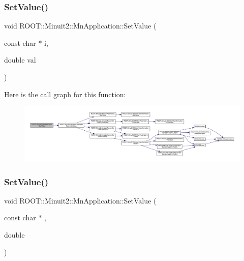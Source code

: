 \subsubsection{\texorpdfstring{SetValue()}{SetValue()}\hspace{0.1cm}{\footnotesize\ttfamily [4/6]}}
{\footnotesize\ttfamily void R\+O\+O\+T\+::\+Minuit2\+::\+Mn\+Application\+::\+Set\+Value (\begin{DoxyParamCaption}\item[{const char $\ast$}]{i,  }\item[{double}]{val }\end{DoxyParamCaption})}

Here is the call graph for this function\+:
\nopagebreak
\begin{figure}[H]
\begin{center}
\leavevmode
\includegraphics[width=350pt]{df/dd5/classROOT_1_1Minuit2_1_1MnApplication_af8376fc6c9a727c8f3dbdc268afb0e7e_cgraph}
\end{center}
\end{figure}
\mbox{\label{classROOT_1_1Minuit2_1_1MnApplication_af8376fc6c9a727c8f3dbdc268afb0e7e}} 
\subsubsection{\texorpdfstring{SetValue()}{SetValue()}\hspace{0.1cm}{\footnotesize\ttfamily [5/6]}}
{\footnotesize\ttfamily void R\+O\+O\+T\+::\+Minuit2\+::\+Mn\+Application\+::\+Set\+Value (\begin{DoxyParamCaption}\item[{const char $\ast$}]{,  }\item[{double}]{ }\end{DoxyParamCaption})}

\mbox{\label{classROOT_1_1Minuit2_1_1MnApplication_af8376fc6c9a727c8f3dbdc268afb0e7e}} 
